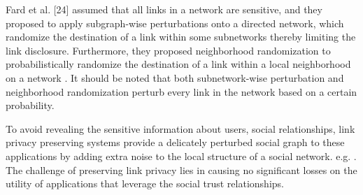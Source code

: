 Fard et al. [24] assumed that all links in a network are sensitive, and they proposed to apply subgraph-wise perturbations onto a directed network, which randomize the destination of a link within some subnetworks thereby limiting the link disclosure. Furthermore, they proposed neighborhood randomization to probabilistically randomize the destination of a link within a local neighborhood on a network \cite{amin:wwwj}. It should be noted that both subnetwork-wise perturbation and neighborhood randomization perturb every link in the network based on a certain probability.


To avoid revealing the sensitive information about users, social relationships, link privacy preserving systems provide a delicately perturbed social graph to these applications by adding extra noise to the local structure of a social network. e.g. \cite{hay2008resisting,mittalNDSS13,ying2008randomizing,zheleva2008preserving}. The challenge of preserving link privacy lies in causing no significant losses on the utility of applications that leverage the social trust relationships.

